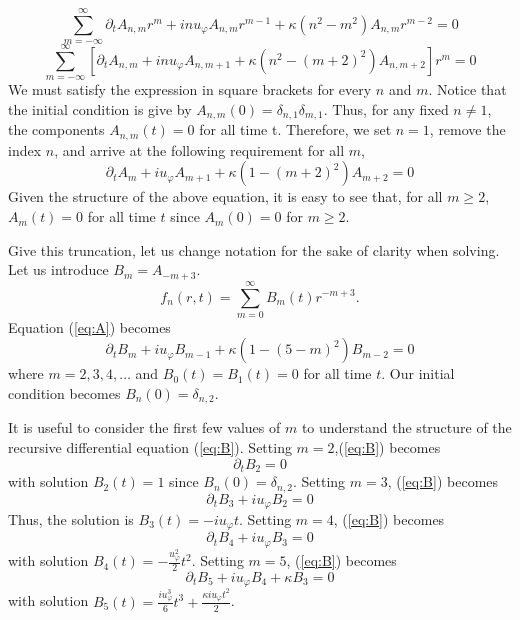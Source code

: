 \documentclass[12pt]{article}
\begin{document}
\begin{equation}
\sum_{m=-\infty}^{\infty}\partial_{t}A_{n,m}r^{m} + inu_{\varphi}A_{n,m}r^{m-1} +  \kappa  (n^2 -m^2) A_{n,m} r^{m-2}  = 0
\end{equation}
\begin{equation}
\sum_{m=-\infty}^{\infty}\left[\partial_{t}A_{n,m} +  inu_{\varphi}A_{n,m+1}+  \kappa  (n^2 -(m+2)^2) A_{n,m+2} \right ] r^{m}  = 0
\end{equation}
We must satisfy the expression in square brackets for every $n$ and $m$. Notice that the initial condition is give by $A_{n,m}(0)=\delta_{n,1}\delta_{m,1}$. Thus, for any fixed $n\neq 1$, the components $A_{n,m}(t)=0$ for all time t. Therefore, we set $n=1$, remove the index $n$, and arrive at the following requirement for all $m$,
\begin{equation}
\label{eq:A}
\partial_{t}A_{m} +  iu_{\varphi}A_{m+1}+  \kappa  (1 -(m+2)^2) A_{m+2}   = 0
\end{equation}
Given the structure of the above equation, it is easy to see that, for all $m\geq 2$, $A_{m}(t)=0$ for all time $t$ since   $A_{m}(0)=0$ for $m\geq 2$. 

Give this truncation, let us change notation for the sake of clarity when solving.  Let us introduce $B_{m}=A_{-m+3}$.
\begin{equation}
\label{eq:Bexpansion}
f_{n}(r,t)=\sum_{m=0}^{\infty}B_{m}(t)r^{-m+3}.
\end{equation}
Equation (\ref{eq:A}) becomes
\begin{equation}
\label{eq:B}
\partial_{t}B_{m} +  iu_{\varphi}B_{m-1}+  \kappa  (1 -(5-m)^2) B_{m-2}   = 0 
\end{equation}
where $m=2,3,4, \dots$ and $B_{0}(t)=B_{1}(t)=0$ for all time $t$. Our initial condition becomes $B_{n}(0)=\delta_{n,2}$. 


It is useful to consider the first few values of $m$ to understand the structure of the recursive differential equation (\ref{eq:B}). Setting $m=2$,(\ref{eq:B}) becomes
\begin{equation}
\partial_{t}B_{2}   = 0
\end{equation}
with solution $B_{2}(t)=1$ since $B_{n}(0)=\delta_{n,2}$.
Setting $m=3$, (\ref{eq:B}) becomes
\begin{equation}
\partial_{t}B_{3} +  iu_{\varphi}B_{2}  = 0
\end{equation}
Thus, the solution is $B_{3}(t)=-iu_{\varphi}t$. Setting $m=4$, (\ref{eq:B}) becomes
\begin{equation}
\partial_{t}B_{4} +  iu_{\varphi}B_{3} = 0
\end{equation}
with solution $B_{4}(t)=-\frac{u_{\varphi}^2}{2}t^2$. Setting $m=5$, (\ref{eq:B}) becomes
\begin{equation}
\partial_{t}B_{5} +  iu_{\varphi}B_{4}+  \kappa  B_{3}   = 0
\end{equation}
with solution $B_{5}(t)= \frac{iu_{\varphi}^3}{6}t^3 +  \frac{\kappa iu_{\varphi}t^2}{2}$. 
\end{document}
